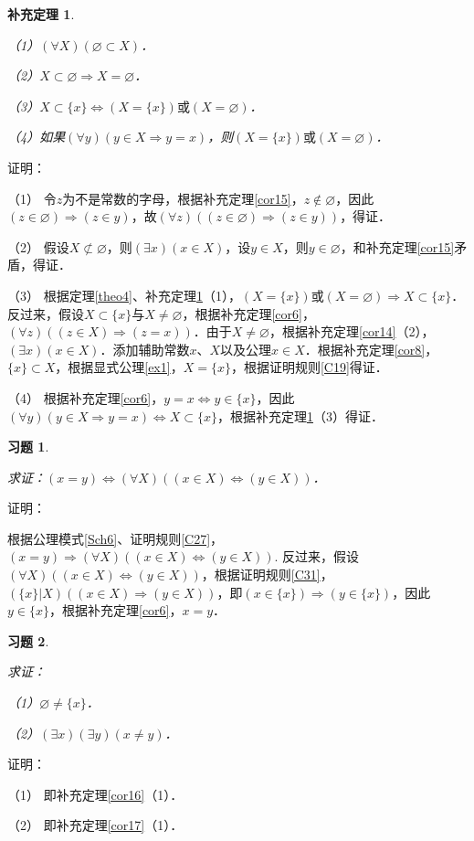 \documentclass[12pt, a4paper, oneside]{book}
\newtheorem{cor}{补充定理}
\newtheorem{exer}{习题}
\begin{document}
			\begin{cor}\label{cor18}
				\hfill\par
				（1）$(\forall X)(\varnothing\subset X)$．
				\par
				（2）$X\subset \varnothing\Rightarrow X=\varnothing$．
				\par
				（3）$X\subset \{x\}\Leftrightarrow (X=\{x\})\text{或}(X= \varnothing)$．
				\par
				（4）如果$(\forall y)(y\in X\Rightarrow y=x)$，则$(X=\{x\})\text{或}(X= \varnothing)$．
			\end{cor}
			证明：
			\par
			（1）	令$z$为不是常数的字母，根据补充定理\ref{cor15}，$z\notin \varnothing$，因此$(z\in \varnothing)\Rightarrow (z\in y)$，故$(\forall z)((z\in \varnothing)\Rightarrow (z\in y))$，得证．
			\par
			（2）	假设$X\not\subset\varnothing$，则$(\exists x)(x\in X)$，设$y\in X$，则$y\in \varnothing$，和补充定理\ref{cor15}矛盾，得证．
			\par
			（3）	根据定理\ref{theo4}、补充定理\ref{cor18}（1），$(X=\{x\})\text{或}(X= \varnothing)\Rightarrow X\subset \{x\}$．反过来，假设$X\subset \{x\}\text{与}X\neq \varnothing$，根据补充定理\ref{cor6}，$(\forall z)((z\in X)\Rightarrow (z=x))$．由于$X\neq \varnothing$，根据补充定理\ref{cor14}（2），$(\exists x)(x\in X)$．添加辅助常数$x$、$X$以及公理$x\in X$．根据补充定理\ref{cor8}，$\{x\}\subset X$，根据显式公理\ref{ex1}，$X=\{x\}$，根据证明规则\ref{C19}得证．
			\par
			（4）	根据补充定理\ref{cor6}，$y=x\Leftrightarrow y\in \{x\}$，因此$(\forall y)(y\in X\Rightarrow y=x)\Leftrightarrow X\subset \{x\}$，根据补充定理\ref{cor18}（3）得证．

			\begin{exer}\label{exer36}
				\hfill\par
				求证：$(x=y)\Leftrightarrow (\forall X)((x\in X)\Leftrightarrow (y\in X))$．
			\end{exer}
			证明：
			\par
			根据公理模式\ref{Sch6}、证明规则\ref{C27}，$(x=y)\Rightarrow (\forall X)((x\in X)\Leftrightarrow (y\in X))$.
			反过来，假设$(\forall X)((x\in X)\Leftrightarrow (y\in X))$，根据证明规则\ref{C31}，$(\{x\}|X)((x\in X)\Rightarrow (y\in X))$，即$(x\in \{x\})\Rightarrow (y\in \{x\})$，因此$y\in \{x\}$，根据补充定理\ref{cor6}，$x=y$．

			\begin{exer}\label{exer37}
				\hfill\par
				求证：
				\par
				（1）$\varnothing\neq \{x\}$．
				\par
				（2）$(\exists x)(\exists y)(x\neq y)$．
			\end{exer}
			证明：
			\par
			（1）	即补充定理\ref{cor16}（1）．
			\par
			（2）	即补充定理\ref{cor17}（1）．
\end{document}
